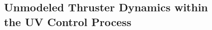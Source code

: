





\subsection{Unmodeled Thruster Dynamics within \\
                the \acs{UV} Control Process}

